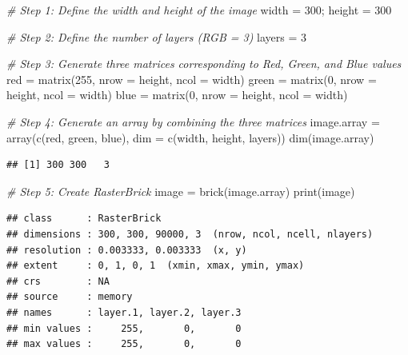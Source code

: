 \documentclass[
  12pt,
]{style/krantz}
\newenvironment{Shaded}{\begin{snugshade}}{\end{snugshade}}
\newcommand{\AttributeTok}[1]{\textcolor[rgb]{0.77,0.63,0.00}{#1}}
\newcommand{\CommentTok}[1]{\textcolor[rgb]{0.56,0.35,0.01}{\textit{#1}}}
\newcommand{\DecValTok}[1]{\textcolor[rgb]{0.00,0.00,0.81}{#1}}
\newcommand{\FunctionTok}[1]{\textcolor[rgb]{0.00,0.00,0.00}{#1}}
\newcommand{\NormalTok}[1]{#1}
\newcommand{\OtherTok}[1]{\textcolor[rgb]{0.56,0.35,0.01}{#1}}
\begin{document}
\begin{Shaded}
\begin{Highlighting}[]
\CommentTok{\# Step 1: Define the width and height of the image}
\NormalTok{width }\OtherTok{=} \DecValTok{300}\NormalTok{; }
\NormalTok{height }\OtherTok{=} \DecValTok{300}

\CommentTok{\# Step 2: Define the number of layers (RGB = 3)}
\NormalTok{layers }\OtherTok{=} \DecValTok{3}

\CommentTok{\# Step 3: Generate three matrices corresponding to Red, Green, and Blue values}
\NormalTok{red }\OtherTok{=} \FunctionTok{matrix}\NormalTok{(}\DecValTok{255}\NormalTok{, }\AttributeTok{nrow =}\NormalTok{ height, }\AttributeTok{ncol =}\NormalTok{ width)}
\NormalTok{green }\OtherTok{=} \FunctionTok{matrix}\NormalTok{(}\DecValTok{0}\NormalTok{, }\AttributeTok{nrow =}\NormalTok{ height, }\AttributeTok{ncol =}\NormalTok{ width)}
\NormalTok{blue }\OtherTok{=} \FunctionTok{matrix}\NormalTok{(}\DecValTok{0}\NormalTok{, }\AttributeTok{nrow =}\NormalTok{ height, }\AttributeTok{ncol =}\NormalTok{ width)}

\CommentTok{\# Step 4: Generate an array by combining the three matrices}
\NormalTok{image.array }\OtherTok{=} \FunctionTok{array}\NormalTok{(}\FunctionTok{c}\NormalTok{(red, green, blue), }\AttributeTok{dim =} \FunctionTok{c}\NormalTok{(width, height, layers))}
\FunctionTok{dim}\NormalTok{(image.array)}
\end{Highlighting}
\end{Shaded}

\begin{verbatim}
## [1] 300 300   3
\end{verbatim}

\begin{Shaded}
\begin{Highlighting}[]
\CommentTok{\# Step 5: Create RasterBrick}
\NormalTok{image }\OtherTok{=} \FunctionTok{brick}\NormalTok{(image.array)}
\FunctionTok{print}\NormalTok{(image)}
\end{Highlighting}
\end{Shaded}

\begin{verbatim}
## class      : RasterBrick 
## dimensions : 300, 300, 90000, 3  (nrow, ncol, ncell, nlayers)
## resolution : 0.003333, 0.003333  (x, y)
## extent     : 0, 1, 0, 1  (xmin, xmax, ymin, ymax)
## crs        : NA 
## source     : memory
## names      : layer.1, layer.2, layer.3 
## min values :     255,       0,       0 
## max values :     255,       0,       0
\end{verbatim}
\end{document}
